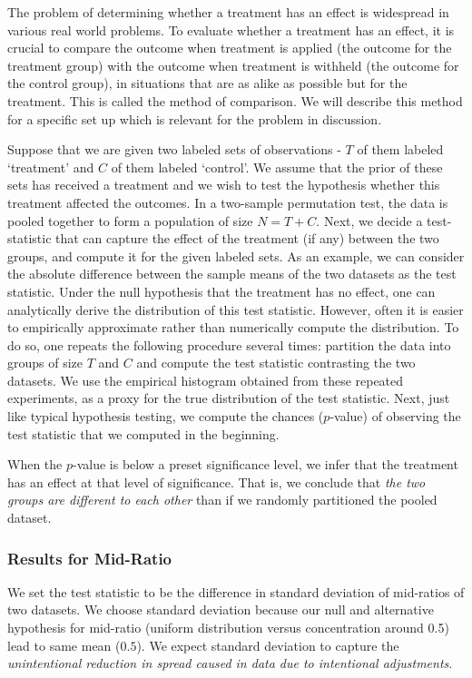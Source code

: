 \documentclass{article}
\begin{document}
The problem of determining whether a treatment has an effect is widespread in various real world problems. To evaluate whether a treatment has an effect, it is crucial to compare the outcome when treatment is applied (the outcome for the treatment group) with the outcome when treatment is withheld (the outcome for the control group), in situations that are as alike as possible but for the treatment. This is called the method of comparison. We will describe this method for a specific set up which is relevant for the problem in discussion.

Suppose that we are given two labeled sets of observations - $T$ of them labeled `treatment' and $C$ of them labeled `control'. We assume that the prior of these sets has received a treatment and we wish to test the hypothesis whether this treatment affected the outcomes. In a two-sample permutation test, the data is pooled together
to form a population of size \(N = T+C\).
Next, we decide a test-statistic that can capture the effect of the treatment (if any) between the two groups, and compute it for the given labeled sets. As an example, we can consider the absolute difference between the sample means of the two datasets as the test statistic. Under the null hypothesis that the treatment has no effect, one can analytically derive the distribution of this test statistic. However, often it is easier to empirically approximate rather than numerically compute the distribution. To do so, one repeats the following procedure several times: partition the data into groups of size \(T\) and \(C\) and compute the test statistic contrasting the two datasets. We use the empirical histogram obtained from these repeated experiments, as a proxy for the true distribution of the test statistic. Next, just like typical hypothesis testing, we compute the chances ($p$-value) of observing the test statistic that we computed in the beginning.

When the $p$-value is below a preset significance level, we infer that the treatment has an effect at that level of significance. That is, we conclude that \textit{the
two groups are different to each other} than if we randomly partitioned
the pooled dataset.


    \subsubsection{Results for
Mid-Ratio}\label{permutation-tests-for-mid-ratio}

We set the test statistic to be the difference in
standard deviation of mid-ratios of two datasets. We choose standard deviation because our null and alternative hypothesis for mid-ratio (uniform distribution versus concentration around 0.5) lead to same mean ($0.5$). We expect standard deviation to capture
the \textit{unintentional reduction in spread caused in data due to
intentional adjustments}.
\end{document}
